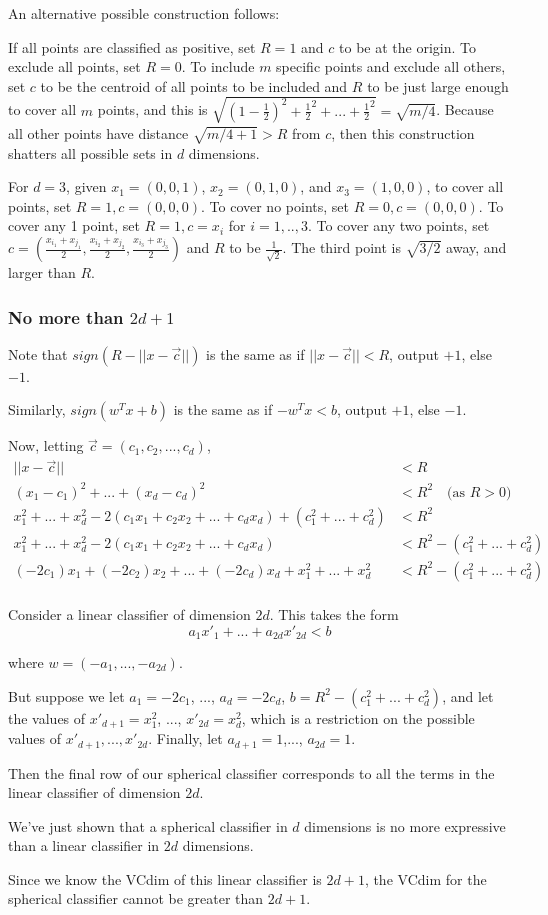 \documentclass[]{article}
\begin{document}
An alternative possible construction follows:

If all points are classified as positive, set $R=1$ and $c$  to be at the origin. To exclude all points, set $R=0$. To include $m$ specific points and exclude all others, set $c$ to be the centroid of all points to be included and $R$ to be just large enough to cover all $m$ points, and this is $\sqrt{(1-\frac{1}{2})^2 + \frac{1}{2}^2 + ... + \frac{1}{2}^2} = \sqrt{m/4}$. Because all other points have distance $\sqrt{m/4+1} > R$ from $c$, then this construction shatters all possible sets in $d$ dimensions.

For $d=3$, given $x_1=(0,0,1)$, $x_2=(0,1,0)$, and $x_3=(1,0,0)$, to cover all points, set $R=1, c=(0,0,0)$. To cover no points, set $R=0, c=(0,0,0)$. To cover any 1 point, set $R=1, c=x_i$ for $i=1,..,3$. To cover any two points, set $c=(\frac{x_{i_1}+x_{j_1}}{2}, \frac{x_{i_2}+x_{j_2}}{2}, \frac{x_{i_3}+x_{j_3}}{2})$ and $R$ to be $\frac{1}{\sqrt{2}}$. The third point is $\sqrt{3/2}$ away, and larger than $R$.

\subsubsection{No more than $2d+1$}
Note that $sign(R-||x-\vec c||)$ is the same as if $||x-\vec c|| < R$, output $+1$, else $-1$.

Similarly, $sign(w^Tx+b)$ is the same as if $-w^Tx < b$, output $+1$, else $-1$.

Now, letting $\vec c = (c_1,c_2,...,c_d)$,
\begin{align*}
||x-\vec c|| &< R \\
(x_1-c_1)^2 + ... + (x_d-c_d)^2 &< R^2 \quad \text{(as $R > 0$)}\\
x_1^2 + ... + x_d^2 -2(c_1x_1 + c_2x_2 + ... + c_dx_d) + (c_1^2 + ... + c_d^2) &< R^2 \\
x_1^2 + ... + x_d^2 -2(c_1x_1 + c_2x_2 + ... + c_dx_d) &< R^2 - (c_1^2 + ... + c_d^2) \\
(-2c_1)x_1 + (-2c_2)x_2 + ... + (-2c_d)x_d + x_1^2 + ... + x_d^2 &< R^2 - (c_1^2 + ... + c_d^2) \\
\end{align*}

Consider a linear classifier of dimension $2d$. This takes the form
\[
a_1x'_1 + ... + a_{2d}x'_{2d} < b
\]

where $w = (-a_1,...,-a_{2d})$.

But suppose we let $a_1 = -2c_1$, ..., $a_d = -2c_d$, $b = R^2 - (c_1^2 + ... + c_d^2)$, and let the values of $x'_{d+1} = x_1^2$, ..., $x'_{2d} = x_d^2$, which is a restriction on the possible values of $x'_{d+1},...,x'_{2d}$. Finally, let $a_{d+1} = 1$,..., $a_{2d} = 1$.

Then the final row of our spherical classifier corresponds to all the terms in the linear classifier of dimension $2d$.

We've just shown that a spherical classifier in $d$ dimensions is no more expressive than a linear classifier in $2d$ dimensions.

Since we know the VCdim of this linear classifier is $2d+1$, the VCdim for the spherical classifier cannot be greater than $2d+1$.
\end{document}
